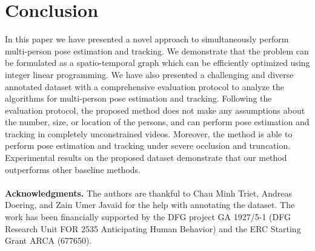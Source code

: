 \documentclass[10pt,twocolumn,letterpaper]{article}
\begin{document}
\section{Conclusion}
\vspace{-1mm}
In this paper we have presented a novel approach to simultaneously perform multi-person pose estimation and tracking. We demonstrate that the problem can be formulated as a spatio-temporal graph which can be efficiently optimized using integer linear programming. We have also presented a challenging and diverse annotated dataset with a comprehensive evaluation protocol to analyze the algorithms for multi-person pose estimation and tracking. Following the evaluation protocol, the proposed method does not make any assumptions about the number, size, or location of the persons, and can perform pose estimation and tracking in completely unconstrained videos. Moreover, the method is able to perform pose estimation and tracking under severe occlusion and truncation. Experimental results on the proposed dataset demonstrate that our method outperforms other baseline methods. \vspace{-7mm} \\ \\ 

\noindent\textbf{Acknowledgments.} The authors are thankful to Chau Minh Triet, Andreas Doering, and Zain Umer Javaid for the help with annotating the dataset. The work has been financially supported by the DFG project GA 1927/5-1 (DFG Research Unit FOR 2535 Anticipating Human Behavior) and the ERC Starting Grant ARCA (677650).

{\small   


}
\end{document}
